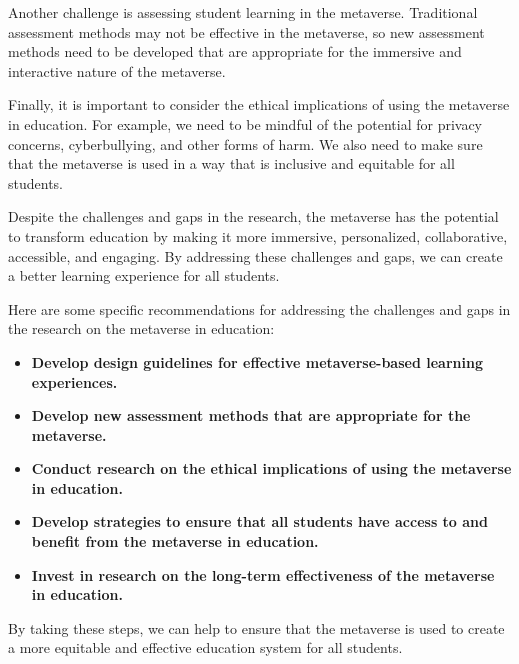 \documentclass[12pt]{extarticle}
\begin{document}
Another challenge is assessing student learning in the metaverse. Traditional assessment methods may not be effective in the metaverse, so new assessment methods need to be developed that are appropriate for the immersive and interactive nature of the metaverse.

Finally, it is important to consider the ethical implications of using the metaverse in education. For example, we need to be mindful of the potential for privacy concerns, cyberbullying, and other forms of harm. We also need to make sure that the metaverse is used in a way that is inclusive and equitable for all students.

Despite the challenges and gaps in the research, the metaverse has the potential to transform education by making it more immersive, personalized, collaborative, accessible, and engaging. By addressing these challenges and gaps, we can create a better learning experience for all students.

Here are some specific recommendations for addressing the challenges and gaps in the research on the metaverse in education:

\begin{itemize}
    \item \textbf{Develop design guidelines for effective metaverse-based learning experiences.}
    \item \textbf{Develop new assessment methods that are appropriate for the metaverse.}
    \item \textbf{Conduct research on the ethical implications of using the metaverse in education.}
    \item \textbf{Develop strategies to ensure that all students have access to and benefit from the metaverse in education.}
    \item \textbf{Invest in research on the long-term effectiveness of the metaverse in education.}
\end{itemize}

By taking these steps, we can help to ensure that the metaverse is used to create a more equitable and effective education system for all students.

\citep{jeongmeta}
\citep{jeoncase}
\citep{kanematsu}
\citep{farjami}
\citep{gwojen}

\end{document}
